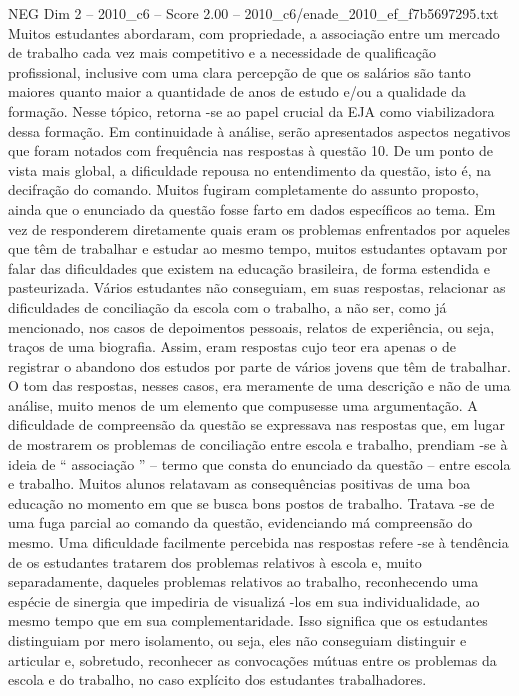 \begin{textsample}{NEG Dim 2 – 2010\_c6 – Score 2.00 – 2010\_c6/enade\_2010\_ef\_f7b5697295.txt}
Muitos estudantes abordaram, com propriedade, a associação entre um mercado de trabalho cada vez mais competitivo e a necessidade de qualificação profissional, inclusive com uma clara percepção de que os salários são tanto maiores quanto maior a quantidade de anos de estudo e/ou a qualidade da formação.
Nesse tópico, retorna -se ao papel crucial da EJA como viabilizadora dessa formação.
Em continuidade à análise, serão apresentados aspectos negativos que foram notados com frequência nas respostas à questão 10.
De um ponto de vista mais global, a dificuldade repousa no entendimento da questão, isto é, na decifração do comando.
Muitos fugiram completamente do assunto proposto, ainda que o enunciado da questão fosse farto em dados específicos ao tema.
Em vez de responderem diretamente quais eram os problemas enfrentados por aqueles que têm de trabalhar e estudar ao mesmo tempo, muitos estudantes optavam por falar das dificuldades que existem na educação brasileira, de forma estendida e pasteurizada.
Vários estudantes não conseguiam, em suas respostas, relacionar as dificuldades de conciliação da escola com o trabalho, a não ser, como já mencionado, nos casos de depoimentos pessoais, relatos de experiência, ou seja, traços de uma biografia.
Assim, eram respostas cujo teor era apenas o de registrar o abandono dos estudos por parte de vários jovens que têm de trabalhar.
O tom das respostas, nesses casos, era meramente de uma descrição e não de uma análise, muito menos de um elemento que compusesse uma argumentação.
A dificuldade de compreensão da questão se expressava nas respostas que, em lugar de mostrarem os problemas de conciliação entre escola e trabalho, prendiam -se à ideia de “ associação ” – termo que consta do enunciado da questão – entre escola e trabalho.
Muitos alunos relatavam as consequências positivas de uma boa educação no momento em que se busca bons postos de trabalho.
Tratava -se de uma fuga parcial ao comando da questão, evidenciando má compreensão do mesmo.
Uma dificuldade facilmente percebida nas respostas refere -se à tendência de os estudantes tratarem dos problemas relativos à escola e, muito separadamente, daqueles problemas relativos ao trabalho, reconhecendo uma espécie de sinergia que impediria de visualizá -los em sua individualidade, ao mesmo tempo que em sua complementaridade.
Isso significa que os estudantes distinguiam por mero isolamento, ou seja, eles não conseguiam distinguir e articular e, sobretudo, reconhecer as convocações mútuas entre os problemas da escola e do trabalho, no caso explícito dos estudantes trabalhadores.

\end{textsample}

